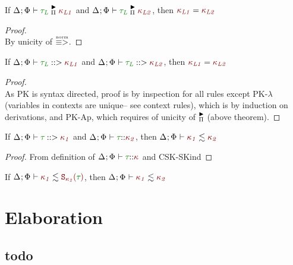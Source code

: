 \documentclass[11pt]{article}
\begin{document}
    \begin{theorem}
        If $\MatchedPiKind{\typ[L]}[\knd[L1]]$ and $\MatchedPiKind{\typ[L]}[\knd[L2]]$, then ${\knd[L1]} = {\knd[L2]}$
    \end{theorem}
    \begin{proof}
         \\
        By unicity of $\stackrel{\text{\tiny norm}}{\equiv >}$.
    \end{proof}
    \begin{theorem}[PK-Unicity]
        If $\PrincipalKind{\typ[L]}[\knd[L1]]$ and $\PrincipalKind{\typ[L]}[\knd[L2]]$, then ${\knd[L1]} = {\knd[L2]}$
    \end{theorem}
    \begin{proof}
         \\
        As PK is syntax directed, proof is by inspection for all rules except PK-$\lambda$
        (variables in contexts are unique-- see context rules),
        which is by induction on derivations,
        and PK-Ap, which requires of unicity of $\stackrel{\blacktriangleright}{{}_{\Pi}}$ (above theorem).
    \end{proof}
    \noindent\hrulefill
    \begin{theorem}[PK-Principality]
        If $\PrincipalKind{\typ}[\knd[1]]$ and $\WellFormedAtKind{\typ}[\knd[2]]$, then $\ConsistentSubKind{\knd[1]}{\knd[2]}$
    \end{theorem}
    \begin{proof}
        From definition of $\WellFormedAtKind{\typ}$ and CSK-SKind
    \end{proof}
    \noindent\hrulefill
    \begin{theorem}
        If $\ConsistentSubKind{\knd[1]}{\SKind[\knd[2]]}$, then $\ConsistentSubKind{\knd[1]}{\knd[2]}$
    \end{theorem}
\section*{Elaboration}
    \subsection*{todo}
\end{document}
